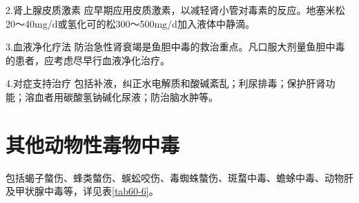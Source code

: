 2.肾上腺皮质激素
应早期应用皮质激素，以减轻肾小管对毒素的反应。地塞米松20～40mg/d或氢化可的松300～500mg/d加入液体中静滴。

3.血液净化疗法
防治急性肾衰竭是鱼胆中毒的救治重点。凡口服大剂量鱼胆中毒的患者，应考虑尽早行血液净化治疗。

4.对症支持治疗
包括补液，纠正水电解质和酸碱紊乱；利尿排毒；保护肝肾功能；溶血者用碳酸氢钠碱化尿液；防治脑水肿等。

\protect\hypertarget{text00178.html}{}{}

\section{其他动物性毒物中毒}

包括蝎子螫伤、蜂类螫伤、蜈蚣咬伤、毒蜘蛛螫伤、斑蝥中毒、蟾蜍中毒、动物肝及甲状腺中毒等，详见表\ref{tab60-6}。

